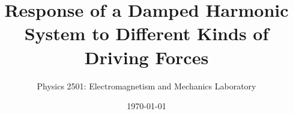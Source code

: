 \documentclass{revtex4}
\begin{document}

\title{Response of a Damped Harmonic System to Different Kinds of
Driving Forces}


\author{Physics 2501: Electromagnetism and Mechanics Laboratory}


\date{\today}


\end{document}
